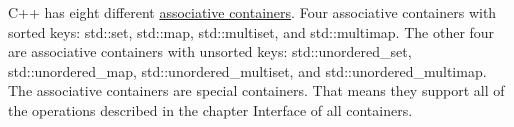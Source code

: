 
C++ has eight different \href{http://en.cppreference.com/w/cpp/container}{associative containers}. Four associative containers with sorted keys: std::set, std::map, std::multiset, and std::multimap. The other four are associative containers with unsorted keys: std::unordered\_set, std::unordered\_map, std::unordered\_multiset, and std::unordered\_multimap. The associative containers are special containers. That means they support all of the operations described in the chapter Interface of all containers.